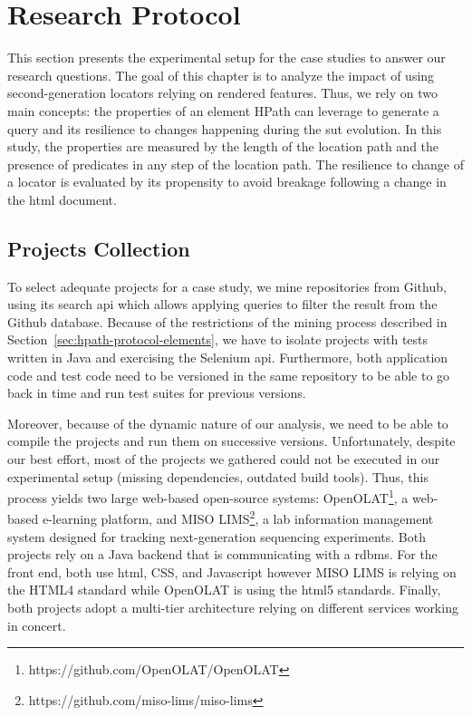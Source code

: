 \section{Research Protocol}
\label{sec:hpath-protocol}

This section presents the experimental setup for the case studies to answer our research questions. The goal of this chapter is to analyze the impact of using second-generation locators relying on rendered features. Thus, we rely on two main concepts: the properties of an element HPath can leverage to generate a query and its resilience to changes happening during the \gls{sut} evolution. In this study, the properties are measured by the length of the location path and the presence of predicates in any step of the location path. The resilience to change of a locator is evaluated by its propensity to avoid breakage following a change in the \gls{html} document.

\subsection{Projects Collection}
\label{sec:hpath-protocol-projects}

To select adequate projects for a case study, we mine repositories from Github, using its search \gls{api} which allows applying queries to filter the result from the Github database. Because of the restrictions of the mining process described in Section~\ref{sec:hpath-protocol-elements}, we have to isolate projects with tests written in Java and exercising the Selenium \gls{api}. Furthermore, both application code and test code need to be versioned in the same repository to be able to go back in time and run test suites for previous versions.

Moreover, because of the dynamic nature of our analysis, we need to be able to compile the projects and run them on successive versions. Unfortunately, despite our best effort, most of the projects we gathered could not be executed in our experimental setup (missing dependencies, outdated build tools). Thus, this process yields two large web-based open-source systems: OpenOLAT\footnote{https://github.com/OpenOLAT/OpenOLAT}, a web-based e-learning platform, and MISO LIMS\footnote{https://github.com/miso-lims/miso-lims}, a lab information management system designed for tracking next-generation sequencing experiments. Both projects rely on a Java backend that is communicating with a \gls{rdbms}. For the front end, both use \gls{html}, CSS, and Javascript however MISO LIMS is relying on the HTML4 standard while OpenOLAT is using the \gls{html}5 standards. Finally, both projects adopt a multi-tier architecture relying on different services working in concert.

